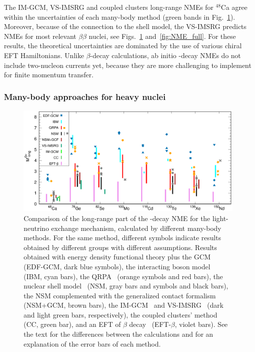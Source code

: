 The IM-GCM, VS-IMSRG and coupled clusters long-range NMEs for $^{48}$Ca agree within the uncertainties of each many-body method (green bands in Fig.~\ref{fig:NME_long}). Moreover, because of the connection to the shell model, the VS-IMSRG predicts NMEs for most relevant $\beta\beta$ nuclei, see Figs.~\ref{fig:NME_long} and~\ref{fig:NME_full}. For these results, the theoretical uncertainties are dominated by the use of various chiral EFT Hamiltonians. Unlike $\beta$-decay calculations, ab initio \bbonu-decay NMEs do not include two-nucleon currents yet, because they are more challenging to implement for finite momentum transfer.

\subsubsection{Many-body approaches for heavy nuclei}
\label{sec:maybody_phen}

\begin{figure}[t]
	\begin{center}
	\includegraphics[width=1.02\textwidth]{img/nme_2023.eps}
	\caption{Comparison of the long-range part of the \bbonu-decay NME for the light-neutrino exchange mechanism, calculated by different many-body methods. For the same method, different symbols indicate results obtained by different groups with different assumptions. Results obtained with energy density functional theory plus the GCM~\cite{Rodriguez:2010mn,LopezVaquero:2013yji,Yao:2014uta} (EDF-GCM, dark blue symbols), the interacting boson model~\cite{Barea:2015kwa,Deppisch:2020ztt} (IBM, cyan bars), the QRPA~\cite{Hyvarinen:2015bda,Simkovic:2018hiq,Mustonen:2013zu,Fang:2018tui,Terasaki:2014rba,Terasaki:2019rbu,Terasaki:2020ndc,Jokiniemi:2022ayc} (orange symbols and red bars), the nuclear shell model~\cite{Horoi:2015tkc,Iwata:2016cxn,Menendez:2017fdf,Horoi:2022ley,Horoi:2023uah,Coraggio:2020hwx,Coraggio:2022vgy,Tsunoda:2023fqw,Jokiniemi:2022ayc} (NSM, gray bars and symbols and black bars), the NSM complemented with the generalized contact formalism~\cite{Weiss:2021rig} (NSM+GCM, brown bars), the IM-GCM~\cite{Yao:2020olm} and VS-IMSRG~\cite{Belley:2020ejd} (dark and light green bars, respectively), the coupled clusters' method~\cite{Novario:2020dmr} (CC, green bar), and an EFT of $\beta$ decay~\cite{Brase:2021uny} (EFT-$\beta$, violet bars). See the text for the differences between the calculations and for an explanation of the error bars of each method. \label{fig:NME_long}}
\end{center}
\end{figure}

